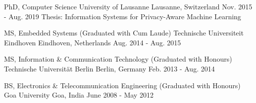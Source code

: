 

\begin{cventries}

  \vspace{-0.2cm}
  \cventry
    {PhD, Computer Science} %
    {University of Lausanne} %
    {Lausanne, Switzerland} %
    {Nov. 2015 - Aug. 2019} %
    {
      Thesis: Information Systems for Privacy-Aware Machine Learning
    }
    
    \cventry
    {MS, Embedded Systems (Graduated with Cum Laude)}
    {Technische Universiteit Eindhoven}
    {Eindhoven, Netherlands}
    {Aug. 2014 - Aug. 2015}
    {}
	
	\vspace{-0.4cm}
    \cventry
    {MS, Information \& Communication Technology (Graduated with Honours)} %
    {Technische Universität Berlin} %
    {Berlin, Germany} %
    {Feb. 2013 - Aug. 2014} %
    {}
	
	\vspace{-0.4cm}
    \cventry
    {BS, Electronics \& Telecommunication Engineering (Graduated with Honours)} %
    {Goa University} %
    {Goa, India} %
    {June 2008 - May 2012} %
    {}
	
	\vspace{-0.9cm}
\end{cventries}

